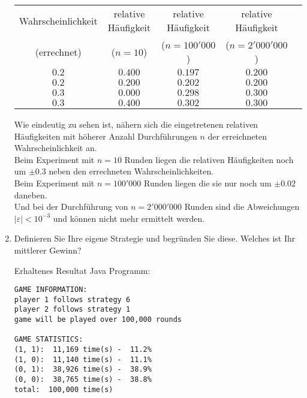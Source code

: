 \documentclass[12pt,a4paper]{article}
\begin{document}
\begin{enumerate}
\begin{center}
\begin{tabular}{c|c c c c}
 Wahrscheinlichkeit & relative Häufigkeit & relative Häufigkeit & relative Häufigkeit\\
    (errechnet)     &       ($n=10$)      &    ($n=100'000$)    &   ($n=2'000'000$)  \\
       $0.2$        &       $0.400$       &       $0.197$       &       $0.200$      \\
       $0.2$        &       $0.200$       &       $0.202$       &       $0.200$      \\
       $0.3$        &       $0.000$       &       $0.298$       &       $0.300$      \\
       $0.3$        &       $0.400$       &       $0.302$       &       $0.300$
\end{tabular}
\end{center}
Wie eindeutig zu sehen ist, nähern sich die eingetretenen relativen Häufigkeiten mit höherer Anzahl Durchführungen $n$ der erreichneten Wahrscheinlichkeit an.\\
Beim Experiment mit $n=10$ Runden liegen die relativen Häufigkeiten noch um $\pm 0.3$ neben den errechneten Wahrscheinlichkeiten.\\
Beim Experiment mit $n=100'000$ Runden liegen die sie nur noch um $\pm 0.02$ daneben.\\
Und bei der Durchführung von $n=2'000'000$ Runden sind die Abweichungen $\left|\varepsilon\right|<10^{-3}$ und können nicht mehr ermittelt werden.
\newpage

\item Definieren Sie Ihre eigene Strategie und begründen Sie diese.
Welches ist Ihr mittlerer Gewinn?
\begin{center}Erhaltenes Resultat Java Programm:\end{center}
\begin{verbatim}
GAME INFORMATION:
player 1 follows strategy 6
player 2 follows strategy 1
game will be played over 100,000 rounds

GAME STATISTICS:
(1, 1):  11,169 time(s) -  11.2%
(1, 0):  11,140 time(s) -  11.1%
(0, 1):  38,926 time(s) -  38.9%
(0, 0):  38,765 time(s) -  38.8%
total:  100,000 time(s)


\end{verbatim}
\end{enumerate}
\end{document}
